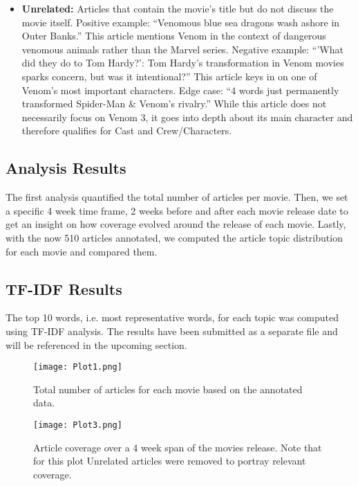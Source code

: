 \documentclass[letterpaper]{article} %
\begin{document}
\begin{itemize}
    \item \textbf{Unrelated:}  
    Articles that contain the movie’s title but do not discuss the movie itself.  
    Positive example: “Venomous blue sea dragons wash ashore in Outer Banks.” This article mentions Venom in the context of dangerous venomous animals rather than the Marvel series.  
    Negative example: “'What did they do to Tom Hardy?': Tom Hardy’s transformation in Venom movies sparks concern, but was it intentional?” This article keys in on one of Venom’s most important characters.  
    Edge case: “4 words just permanently transformed Spider-Man \& Venom’s rivalry.” While this article does not necessarily focus on Venom 3, it goes into depth about its main character and therefore qualifies for Cast and Crew/Characters.  
\end{itemize}

\subsection{Analysis Results}

The first analysis quantified the total number of articles per movie. Then, we set a specific 4 week time frame, 2 weeks before and after each movie release date to get an  insight on how coverage evolved around the release of each movie. Lastly, with the now 510 articles annotated, we computed the article topic distribution for each movie and compared them. 

\subsection{TF-IDF Results}

The top 10 words, i.e. most representative words, for each topic was computed using TF-IDF analysis. The results have been submitted as a separate file and will be referenced in the upcoming section.


\begin{figure}
    \centering
    \texttt{[image: Plot1.png]}
    \caption{Total number of articles for each movie based on the annotated data.}
    \label{fig:example-plot1}
\end{figure}

\begin{figure}
    \centering
    \texttt{[image: Plot3.png]}
    \caption{Article coverage over a 4 week span of the movies release. Note that for this plot Unrelated articles were removed to portray relevant coverage.}
    \label{fig:example-plot2}
\end{figure}
\end{document}
